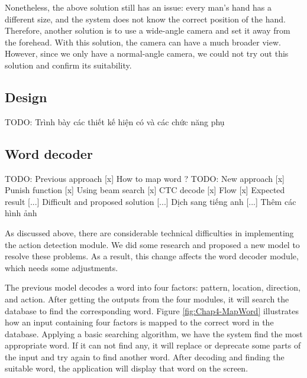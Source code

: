 Nonetheless, the above solution still has an issue: every man's hand has a different size, and the system does not know the correct position of the hand. Therefore, another solution is to use a wide-angle camera and set it away from the forehead. With this solution, the camera can have a much broader view. However, since we only have a normal-angle camera, we could not try out this solution and confirm its suitability.

\subsection{Design}
  TODO: Trình bày các thiết kế hiện có và các chức năng phụ

\subsection{Word decoder}
TODO:   Previous approach 
      [x] How to map word ?
TODO:   New approach
      [x] Punish function
      [x] Using beam search
      [x] CTC decode
      [x] Flow
      [x] Expected result
      [...] Difficult and proposed solution
      [...] Dịch sang tiếng anh
      [...] Thêm các hình ảnh



    As discussed above, there are considerable technical difficulties in implementing the action detection module. We did some research and proposed a new model to resolve these problems. As a result, this change affects the word decoder module, which needs some adjustments.

    The previous model decodes a word into four factors: pattern, location, direction, and action. After getting the outputs from the four modules, it will search the database to find the corresponding word. Figure \ref{fig:Chap4-MapWord} illustrates how an input containing four factors is mapped to the correct word in the database. Applying a basic searching algorithm, we have the system find the most appropriate word. If it can not find any, it will replace or deprecate some parts of the input and try again to find another word. After decoding and finding the suitable word, the application will display that word on the screen.

